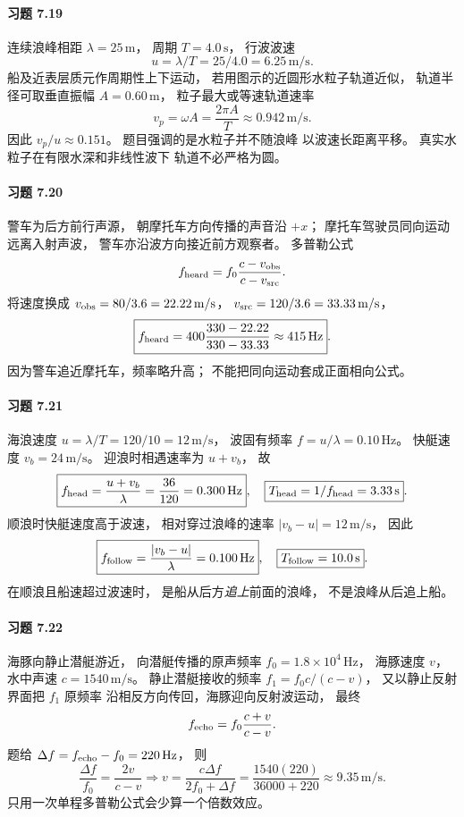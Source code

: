 \paragraph{习题 7.19}
连续浪峰相距
\(\lambda=25\,\mathrm m\)，
周期 \(T=4.0\,\mathrm s\)，
行波波速
\[
 \boxed{u=\lambda/T
 =25/4.0=6.25\,\mathrm{m/s}}.
\]
船及近表层质元作周期性上下运动，
若用图示的近圆形水粒子轨道近似，
轨道半径可取垂直振幅
\(A=0.60\,\mathrm m\)，
粒子最大或等速轨道速率
\[
 \boxed{v_p=\omega A
 =\frac{2\pi A}T
 \approx0.942\,\mathrm{m/s}}.
\]
因此
\(\boxed{v_p/u\approx0.151}\)。
题目强调的是水粒子并不随浪峰
以波速长距离平移。
真实水粒子在有限水深和非线性波下
轨道不必严格为圆。

\paragraph{习题 7.20}
警车为后方前行声源，
朝摩托车方向传播的声音沿 \(+x\)；
摩托车驾驶员同向运动远离入射声波，
警车亦沿波方向接近前方观察者。
多普勒公式
\[
 f_{\rm heard}=f_0
 \frac{c-v_{\rm obs}}{c-v_{\rm src}}.
\]
将速度换成
\(v_{\rm obs}=80/3.6=22.22\,\mathrm{m/s}\)，
\(v_{\rm src}=120/3.6=33.33\,\mathrm{m/s}\)，
\[
 \boxed{f_{\rm heard}
 =400\frac{330-22.22}{330-33.33}
 \approx415\,\mathrm{Hz}}.
\]
因为警车追近摩托车，频率略升高；
不能把同向运动套成正面相向公式。

\paragraph{习题 7.21}
海浪速度
\(u=\lambda/T=120/10=12\,\mathrm{m/s}\)，
波固有频率 \(f=u/\lambda=0.10\,\mathrm{Hz}\)。
快艇速度 \(v_b=24\,\mathrm{m/s}\)。
迎浪时相遇速率为 \(u+v_b\)，
故
\[
 \boxed{f_{\rm head}=\frac{u+v_b}\lambda
 =\frac{36}{120}=0.300\,\mathrm{Hz}},\quad
 \boxed{T_{\rm head}=1/f_{\rm head}
 =3.33\,\mathrm s}.
\]
顺浪时快艇速度高于波速，
相对穿过浪峰的速率
\(|v_b-u|=12\,\mathrm{m/s}\)，
因此
\[
 \boxed{f_{\rm follow}=\frac{|v_b-u|}{\lambda}
 =0.100\,\mathrm{Hz}},\quad
 \boxed{T_{\rm follow}=10.0\,\mathrm s}.
\]
在顺浪且船速超过波速时，
是船从后方\emph{追上}前面的浪峰，
不是浪峰从后追上船。

\paragraph{习题 7.22}
海豚向静止潜艇游近，
向潜艇传播的原声频率
\(f_0=1.8\times10^4\,\mathrm{Hz}\)，
海豚速度 \(v\)，
水中声速 \(c=1540\,\mathrm{m/s}\)。
静止潜艇接收的频率
\(f_1=f_0c/(c-v)\)，
又以静止反射界面把 \(f_1\) 原频率
沿相反方向传回，海豚迎向反射波运动，
最终
\[
 f_{\rm echo}=f_0\frac{c+v}{c-v}.
\]
题给
\(\Delta f=f_{\rm echo}-f_0=220\,\mathrm{Hz}\)，
则
\[
 \frac{\Delta f}{f_0}
 =\frac{2v}{c-v}
 \Longrightarrow
 \boxed{v=\frac{c\Delta f}{2f_0+\Delta f}
 =\frac{1540(220)}{36000+220}
 \approx9.35\,\mathrm{m/s}}.
\]
只用一次单程多普勒公式会少算一个倍数效应。

